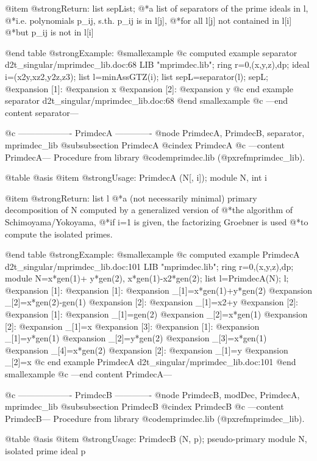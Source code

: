 @item @strong{Return:}
list sepList;
@*a list of separators of the prime ideals in l,
@*i.e. polynomials p_ij, s.th. p_ij is in l[j],
@*for all l[j] not contained in l[i]
@*but p_ij is not in l[i]

@end table
@strong{Example:}
@smallexample
@c computed example separator d2t_singular/mprimdec_lib.doc:68 
LIB "mprimdec.lib";
ring r=0,(x,y,z),dp;
ideal i=(x2y,xz2,y2z,z3);
list l=minAssGTZ(i);
list sepL=separator(l);
sepL;
@expansion{} [1]:
@expansion{}    x
@expansion{} [2]:
@expansion{}    y
@c end example separator d2t_singular/mprimdec_lib.doc:68
@end smallexample
@c ---end content separator---

@c ------------------- PrimdecA -------------
@node PrimdecA, PrimdecB, separator, mprimdec_lib
@subsubsection PrimdecA
@cindex PrimdecA
@c ---content PrimdecA---
Procedure from library @code{mprimdec.lib} (@pxref{mprimdec_lib}).

@table @asis
@item @strong{Usage:}
PrimdecA (N[, i]); module N, int i

@item @strong{Return:}
list l
@*a (not necessarily minimal) primary decomposition of N
computed by a generalized version of
@*the algorithm of Schimoyama/Yokoyama,
@*if i=1 is given, the factorizing Groebner is used
@*to compute the isolated primes.

@end table
@strong{Example:}
@smallexample
@c computed example PrimdecA d2t_singular/mprimdec_lib.doc:101 
LIB "mprimdec.lib";
ring r=0,(x,y,z),dp;
module N=x*gen(1)+ y*gen(2),
x*gen(1)-x2*gen(2);
list l=PrimdecA(N);
l;
@expansion{} [1]:
@expansion{}    [1]:
@expansion{}       _[1]=x*gen(1)+y*gen(2)
@expansion{}       _[2]=x*gen(2)-gen(1)
@expansion{}    [2]:
@expansion{}       _[1]=x2+y
@expansion{} [2]:
@expansion{}    [1]:
@expansion{}       _[1]=gen(2)
@expansion{}       _[2]=x*gen(1)
@expansion{}    [2]:
@expansion{}       _[1]=x
@expansion{} [3]:
@expansion{}    [1]:
@expansion{}       _[1]=y*gen(1)
@expansion{}       _[2]=y*gen(2)
@expansion{}       _[3]=x*gen(1)
@expansion{}       _[4]=x*gen(2)
@expansion{}    [2]:
@expansion{}       _[1]=y
@expansion{}       _[2]=x
@c end example PrimdecA d2t_singular/mprimdec_lib.doc:101
@end smallexample
@c ---end content PrimdecA---

@c ------------------- PrimdecB -------------
@node PrimdecB, modDec, PrimdecA, mprimdec_lib
@subsubsection PrimdecB
@cindex PrimdecB
@c ---content PrimdecB---
Procedure from library @code{mprimdec.lib} (@pxref{mprimdec_lib}).

@table @asis
@item @strong{Usage:}
PrimdecB (N, p); pseudo-primary module N, isolated prime ideal p

